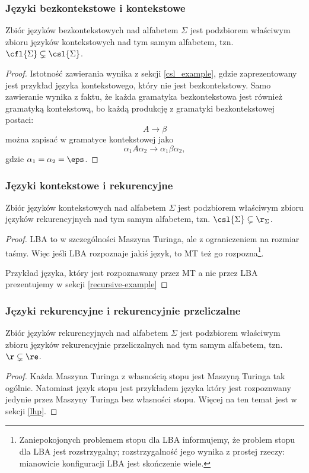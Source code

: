 \subsubsection{Języki bezkontekstowe i kontekstowe}

\begin{theorem}
Zbiór języków bezkontekstowych nad alfabetem \( \Sigma \) jest podzbiorem właściwym zbioru języków kontekstowych nad tym samym alfabetem, tzn. \(\cfl{\Sigma} \subsetneq \csl{\Sigma}\).
\end{theorem}

\begin{proof}
Istotność zawierania wynika z sekcji \ref{csl_example}, gdzie zaprezentowany jest przykład języka kontekstowego, który nie jest bezkontekstowy. Samo zawieranie wynika z faktu, że każda gramatyka bezkontekstowa jest również gramatyką kontekstową, bo każdą produkcję z gramatyki bezkontekstowej postaci: 
\[
    A \rightarrow \beta 
\]
można zapisać w gramatyce kontekstowej jako
\[ 
  \alpha_1 A \alpha_2 \rightarrow \alpha_1 \beta \alpha_2,
\]
gdzie \(\alpha_1 = \alpha_2 = \eps\).
\end{proof}

\subsubsection{Języki kontekstowe i rekurencyjne}
\begin{theorem}
Zbiór języków kontekstowych nad alfabetem \( \Sigma \) jest podzbiorem właściwym zbioru języków rekurencyjnych nad tym samym alfabetem, tzn. \(\csl{\Sigma} \subsetneq \r_{\Sigma}\).
\end{theorem}

\begin{proof}
LBA to w szczególności Maszyna Turinga, ale z ograniczeniem na rozmiar taśmy. Więc jeśli LBA rozpoznaje jakiś język, to MT też go rozpozna\footnote{Zaniepokojonych problemem stopu dla LBA informujemy, że problem stopu dla LBA jest rozstrzygalny; rozstrzygalność jego wynika z prostej rzeczy: mianowicie konfiguracji LBA jest skończenie wiele.}.

Przykład języka, który jest rozpoznawany przez MT a nie przez LBA prezentujemy w sekcji \ref{recursive-example}
\end{proof}

\subsubsection{Języki rekurencyjne i rekurencyjnie przeliczalne}
\begin{theorem}
Zbiór języków rekurencyjnych nad alfabetem \( \Sigma \) jest podzbiorem właściwym zbioru języków rekurencyjnie przeliczalnych nad tym samym alfabetem, tzn. \( \r \subsetneq \re \).
\end{theorem}

\begin{proof}
Każda Maszyna Turinga z własnością stopu jest Maszyną Turinga tak ogólnie. Natomiast język stopu jest przykładem języka który jest rozpoznwany jedynie przez Maszyny Turinga bez własności stopu. Więcej na ten temat jest w sekcji \ref{lhp}.
\end{proof}